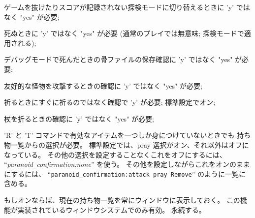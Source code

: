 ゲームを抜けたりスコアが記録されない探検モードに切り替えるときに
'y' ではなく "yes" が必要;
\item[{\tt die~~~~}]
死ぬときに 'y' ではなく "yes" が必要
(通常のプレイでは無意味; 探検モードで適用される);
\item[{\tt bones~~}]
デバッグモードで死んだときの骨ファイルの保存確認に 'y' ではなく "yes" が必要;
\item[{\tt attack~}]
友好的な怪物を攻撃するときの確認に 'y' ではなく "yes" が必要;
\item[{\tt pray~~~}]
祈るときにすぐに祈るのではなく確認で 'y' が必要; 標準設定でオン;
\item[{\tt wand}]
杖を折るときの確認に 'y' ではなく "yes" が必要;
\item[{\tt Remove~}]
'R' と 'T' コマンドで有効なアイテムを一つしか身につけていないときでも
持ち物一覧からの選択が必要。
\elist
標準設定では、pray 選択がオン、それ以外はオフになっている。
その他の選択を設定することなくこれをオフにするには、
``{\it paranoid\verb+_+confirmation:none}'' を使う。
その他を設定しながらこれをオンのままにするには、
``{\tt paranoid_confirmation:attack pray Remove}'' のように一覧に含める。
\item[\ib{perm\verb+_+invent}]
もしオンならば、現在の持ち物一覧を常にウィンドウに表示しておく。
この機能が実装されているウィンドウシステムでのみ有効。
永続する。
\item[\ib{pettype}]
